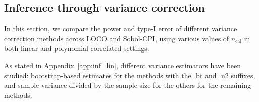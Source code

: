 \documentclass{article}
\theoremstyle{plain}
\theoremstyle{definition}
\theoremstyle{remark}
\begin{document}
    





\subsection{Inference through variance correction}\label{subsec:app_inf}
In this section, we compare the power and type-I error of different variance correction methods across LOCO and Sobol-CPI, using various values of $n_\mathrm{cal}$ in both linear and polynomial correlated settings.

As stated in Appendix~\ref{app:inf_lin}, different variance estimators have been studied: bootstrap-based estimates for the methods with the $\_\mathrm{bt}$ and $\_\mathrm{n2}$ suffixes, and sample variance divided by the sample size for the others for the remaining methods.
\end{document}

